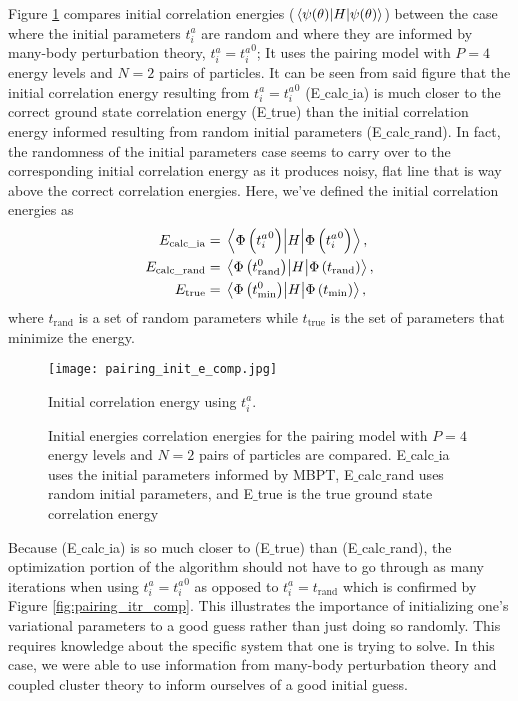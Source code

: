 \documentclass[10pt]{article}
\begin{document}
Figure \ref{fig:pairing_init_e_comp} compares initial correlation energies ($\mel{\psi(\theta)}{H}{\psi(\theta)}$) between the case where the initial parameters $t^a_i$ are random and where they are informed by many-body perturbation theory, $t_i^a={t_i^a}^{0}$; It uses the pairing model with $P=4$ energy levels and $N=2$ pairs of particles. It can be seen from said figure that the initial correlation energy resulting from $t_i^a={t_i^a}^{0}$ (E$\_$calc$\_$ia) is much closer to the correct ground state correlation energy (E$\_$true) than the initial correlation energy informed resulting from random initial parameters (E$\_$calc$\_$rand). In fact, the randomness of the initial parameters case seems to carry over to the corresponding initial correlation energy as it produces noisy, flat line that is way above the correct correlation energies. Here, we've defined the initial correlation energies as
\begin{align}
\label{initial_energies}
E_{\text{calc\_ia}} &= \mel{\Phi\left({t_i^a}^{0}\right)}{H}{\Phi\left({t_i^a}^{0}\right)},
\\
E_{\text{calc\_rand}} &= \mel{\Phi\left(t_{\text{rand}}^{0}\right)}{H}{\Phi\left(t_{\text{rand}}\right)},
\\
E_{\text{true}} &= \mel{\Phi\left(t_{\text{min}}^{0}\right)}{H}{\Phi\left(t_{\text{min}}\right)},
\end{align}
where $t_{\text{rand}}$ is a set of random parameters while $t_{\text{true}}$ is the set of parameters that minimize the energy.

\begin{figure}[H]
    \centering
    \texttt{[image: pairing\_init\_e\_comp.jpg]}
    \caption
    {Initial correlation energy using $t_i^a$.}
    \label{fig:pairing_init_e_comp}
    \caption{Initial energies correlation energies for the pairing model with $P=4$ energy levels and $N=2$ pairs of particles are compared. E$\_$calc$\_$ia uses the initial parameters informed by MBPT, E$\_$calc$\_$rand uses random initial parameters, and E$\_$true is the true ground state correlation energy}
\end{figure}

Because (E$\_$calc$\_$ia) is so much closer to (E$\_$true) than (E$\_$calc$\_$rand), the optimization portion of the algorithm should not have to go through as many iterations when using $t_i^a={t_i^a}^{0}$ as opposed to $t_i^a=t_{\text{rand}}$  which is confirmed by Figure \ref{fig:pairing_itr_comp}. This illustrates the importance of initializing one's variational parameters to a good guess rather than just doing so randomly. This requires knowledge about the specific system that one is trying to solve. In this case, we were able to use information from many-body perturbation theory and coupled cluster theory to inform ourselves of a good initial guess.
\end{document}
